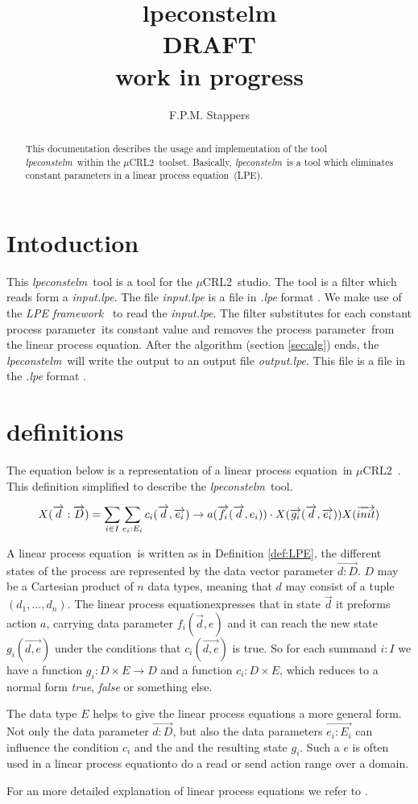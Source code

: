 \documentclass[a4paper,10pt]{article}
\title{lpeconstelm \\ DRAFT \\ work in progress}
\author{F.P.M. Stappers}
\newcommand{\lpe}{linear process equation}
\newcommand{\tool}{\textit{lpeconstelm}}
\newcommand{\ovr}{\overrightarrow}
\newcommand{\mcrl}{$\mu$CRL2}
\newcommand{\framework}{\textit{LPE framework} \cite{LPEframework}}
\newcommand{\pp}{process parameter}
\newcommand{\ti}{\textit}
\begin{document}
\maketitle

\begin{abstract}
This documentation describes the usage and implementation of the tool \tool\ within the \mcrl\ toolset.
Basically, \tool\ is a tool which eliminates constant parameters in a \lpe\ (LPE).
\end{abstract}

\tableofcontents

\section{Intoduction}
This \tool\ tool is a tool for the \mcrl\ studio. The tool is a
filter which reads form a \ti{input.lpe}. The file \ti{input.lpe} is
a file in \ti{.lpe} format \cite{LPEformat}. We make use of the
\framework\ to read the \ti{input.lpe}. The filter substitutes for
each constant \pp\ its constant value and removes the \pp\ from the
\lpe . After the algorithm (section \ref{sec:alg}) ends, the \tool\
will write the output to an output file \ti{output.lpe}. This file is
a file in the \ti{.lpe} format \cite{LPEformat}.

\section{definitions} \label{sec:def}

The equation below is a representation of a \lpe\ in \mcrl\ . This definition simplified to describe the \tool\ tool.
\begin{defn}[\lpe]\label{def:LPE}
\begin{displaymath}
X (\ovr{d}:\ovr{D}) = \sum_{i \in I} \sum_{e_i:E_i} c_i ( \ovr{d}, \ovr{e_i} ) \rightarrow a(\ovr{f_i}(\ovr{d},e_i)) \cdot X(\ovr{g_i}(\ovr{d},\ovr{e_i})) $$
$$ X(\ovr{init})
\end{displaymath}

A \lpe\ is written as in Definition \ref{def:LPE}, the different states of the process are represented by the data vector parameter $\ovr{d:D}$. $D$ may be a Cartesian product of $n$ data types, meaning that $d$ may consist of a tuple $(d_1, \ldots, d_n)$. The \lpe expresses that in state $\ovr{d}$ it preforms action $a$, carrying data parameter $f_i(\ovr{d},e)$ and it can reach the new state $g_i(\ovr{d,e})$ under the conditions that $c_i(\ovr{d,e})$ is true. So for each summand $i:I$ we have a function $g_i: D \times E \rightarrow D$ and a function $c_i: D \times E $, which reduces to a normal form \ti{true}, \ti{false} or something else. 

The data type $E$ helps to give the \lpe s a more general form. Not only the data parameter $\ovr{d:D}$, but also the data parameters $\ovr{e_i: E_i}$ can influence the condition $c_i$ and the and the resulting state $g_i$. Such a $e$ is often used in a \lpe to do a read or send action range over a domain. 

For an more detailed explanation of \lpe s  we refer to \cite{LPE_info}.
\end{defn}
\end{document}
